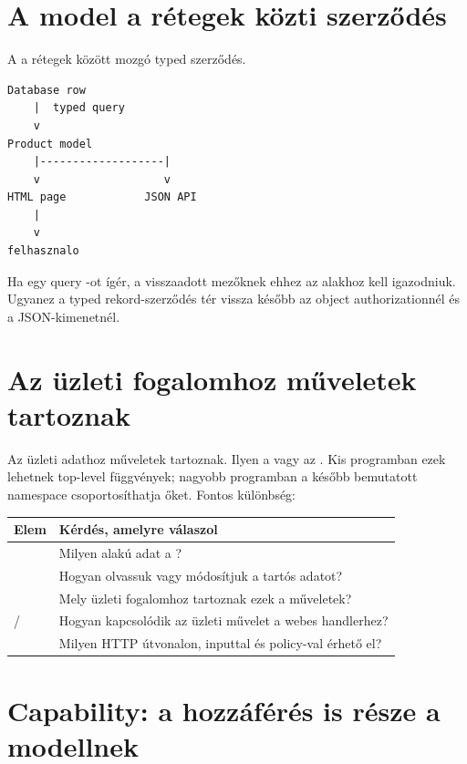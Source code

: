 \section{A model a rétegek közti szerződés}

A  a rétegek között mozgó typed szerződés.

\begin{lstlisting}
Database row
    |  typed query
    v
Product model
    |-------------------|
    v                   v
HTML page            JSON API
    |
    v
felhasznalo
\end{lstlisting}

Ha egy query -ot ígér, a visszaadott mezőknek ehhez az alakhoz kell igazodniuk. Ugyanez a typed rekord-szerződés tér vissza később az object authorizationnél és a JSON-kimenetnél.

\section{Az üzleti fogalomhoz műveletek tartoznak}

Az üzleti adathoz műveletek tartoznak. Ilyen a  vagy az . Kis programban ezek lehetnek top-level függvények; nagyobb programban a később bemutatott  namespace csoportosíthatja őket. Fontos különbség:

\begin{center}
\begin{tabularx}{\textwidth}{@{}lY@{}}
\toprule
Elem & Kérdés, amelyre válaszol \\
\midrule
{} & Milyen alakú adat a ? \\
 & Hogyan olvassuk vagy módosítjuk a tartós adatot? \\
 & Mely üzleti fogalomhoz tartoznak ezek a műveletek? \\
/ & Hogyan kapcsolódik az üzleti művelet a webes handlerhez? \\
 & Milyen HTTP útvonalon, inputtal és policy-val érhető el? \\
\bottomrule
\end{tabularx}
\end{center}

\section{Capability: a hozzáférés is része a modellnek}

